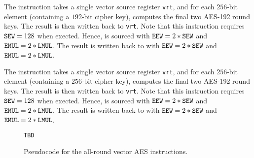 The  instruction takes a single
vector source register {\tt vrt}, and for each $256$-bit element
(containing a $192$-bit cipher key),
computes the final two AES-192 round keys.
The result is then written back to {\tt vrt}.
Note that this instruction requires ${\tt SEW}=128$ when exected.
Hence, \vrt is sourced with ${\tt EEW}=2*{\tt SEW}$ and ${\tt EMUL}=2*{\tt LMUL}$.
The result is written back to \vrt with
${\tt EEW}=2*{\tt SEW}$ and ${\tt EMUL}=2*{\tt LMUL}$.

The  instruction takes a single
vector source register {\tt vrt}, and for each $256$-bit element
(containing a $256$-bit cipher key),
computes the final two AES-192 round keys.
The result is then written back to {\tt vrt}.
Note that this instruction requires ${\tt SEW}=128$ when exected.
Hence, \vrt is sourced with ${\tt EEW}=2*{\tt SEW}$ and ${\tt EMUL}=2*{\tt LMUL}$.
The result is written back to \vrt with
${\tt EEW}=2*{\tt SEW}$ and ${\tt EMUL}=2*{\tt LMUL}$.



\begin{figure}[h]
\begin{lstlisting}[language=pseudo]
TBD
\end{lstlisting}
\caption{Pseudocode for the all-round vector AES instructions.}
\label{fig:pseudo:aes:vector:all-round}
\end{figure}

